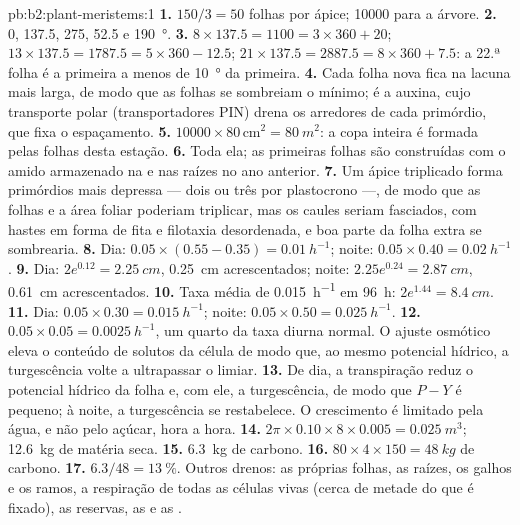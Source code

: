 \begin{solution}{pb:b2:plant-meristems:1}
\textbf{1.} $150/3 = 50$ folhas por ápice; \num{10000} para a árvore.
\textbf{2.} 0, 137.5, 275, 52.5 e \qty{190}{\degree}.
\textbf{3.} $8\times 137.5 = 1100 = 3\times 360 + 20$; $13\times 137.5
= 1787.5 = 5\times 360 - 12.5$; $21\times 137.5 = 2887.5 = 8\times 360
+ 7.5$: a 22.ª folha é a primeira a menos de \qty{10}{\degree} da
primeira.
\textbf{4.} Cada folha nova fica na lacuna mais larga, de modo que as
folhas se sombreiam o mínimo; é a auxina, cujo transporte polar
(transportadores PIN) drena os arredores de cada primórdio, que fixa o
espaçamento.
\textbf{5.} $\num{10000}\times 80\,\text{cm}^{2} = \qty{80}{m^2}$: a
copa inteira é formada pelas folhas desta estação.
\textbf{6.} Toda ela; as primeiras folhas são construídas com o amido
armazenado na  e nas raízes no ano anterior.
\textbf{7.} Um ápice triplicado forma primórdios mais depressa --- dois
ou três por plastocrono ---, de modo que as folhas e a área foliar
poderiam triplicar, mas os caules seriam fasciados, com hastes em
forma de fita e filotaxia desordenada, e boa parte da folha extra se
sombrearia.
\textbf{8.} Dia: $0.05\times(0.55 - 0.35) = \qty{0.01}{h^{-1}}$; noite:
$0.05\times 0.40 = \qty{0.02}{h^{-1}}$.
\textbf{9.} Dia: $2e^{0.12} = \qty{2.25}{cm}$, \qty{0.25}{cm}
acrescentados; noite: $2.25e^{0.24} = \qty{2.87}{cm}$, \qty{0.61}{cm}
acrescentados.
\textbf{10.} Taxa média de \qty{0.015}{h^{-1}} em \qty{96}{h}: $2e^{1.44}
= \qty{8.4}{cm}$.
\textbf{11.} Dia: $0.05\times 0.30 = \qty{0.015}{h^{-1}}$; noite:
$0.05\times 0.50 = \qty{0.025}{h^{-1}}$.
\textbf{12.} $0.05\times 0.05 = \qty{0.0025}{h^{-1}}$, um quarto da taxa
diurna normal. O ajuste osmótico eleva o conteúdo de solutos da célula
de modo que, ao mesmo potencial hídrico, a turgescência volte a
ultrapassar o limiar.
\textbf{13.} De dia, a transpiração reduz o potencial hídrico da folha
e, com ele, a turgescência, de modo que $P - Y$ é pequeno; à noite, a
turgescência se restabelece. O crescimento é limitado pela água, e não
pelo açúcar, hora a hora.
\textbf{14.} $2\pi\times 0.10\times 8\times 0.005 = \qty{0.025}{m^3}$;
\qty{12.6}{kg} de matéria seca.
\textbf{15.} \qty{6.3}{kg} de carbono.
\textbf{16.} $80\times 4\times 150 = \qty{48}{kg}$ de carbono.
\textbf{17.} $6.3/48 = \qty{13}{\%}$. Outros drenos: as próprias folhas,
as raízes, os galhos e os ramos, a respiração de todas as células vivas
(cerca de metade do que é fixado), as reservas, as  e as
.

\end{solution}

